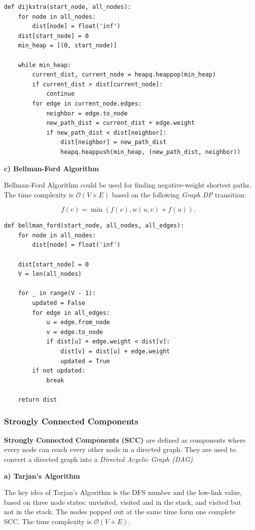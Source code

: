 \documentclass{article}
\begin{document}
\begin{lstlisting}[style=python]
def dijkstra(start_node, all_nodes):
    for node in all_nodes:
        dist[node] = float('inf')
    dist[start_node] = 0
    min_heap = [(0, start_node)]
    
    while min_heap:
        current_dist, current_node = heapq.heappop(min_heap)
        if current_dist > dist[current_node]:
            continue
        for edge in current_node.edges:
            neighbor = edge.to_node
            new_path_dist = current_dist + edge.weight
            if new_path_dist < dist[neighbor]:
                dist[neighbor] = new_path_dist
                heapq.heappush(min_heap, (new_path_dist, neighbor))
\end{lstlisting}

\textbf{c) Bellman-Ford Algorithm}

Bellman-Ford Algorithm could be used for finding negative-weight shortest paths. The time complexity is $\mathcal O(V\times E)$ based on the following \emph{Graph DP} transition:

$$
f(v)=\min(f(v),w(u,v)+f(u)).
$$

\begin{lstlisting}[style=python]
def bellman_ford(start_node, all_nodes, all_edges):
    for node in all_nodes:
        dist[node] = float('inf')
        
    dist[start_node] = 0
    V = len(all_nodes)
    
    for _ in range(V - 1):
        updated = False
        for edge in all_edges:
            u = edge.from_node
            v = edge.to_node
            if dist[u] + edge.weight < dist[v]:
                dist[v] = dist[u] + edge.weight
                updated = True
        if not updated:
            break
            
    return dist
\end{lstlisting}

\subsubsection{Strongly Connected Components}

\textbf{Strongly Connected Components (SCC)} are defined as components where every node can reach every other node in a directed graph. They are used to convert a directed graph into a \emph{Directed Acyclic Graph (DAG)}.

\textbf{a) Tarjan's Algorithm}

The key idea of Tarjan's Algorithm is the DFS number and the low-link value, based on three node states: unvisited, visited and in the stack, and visited but not in the stack. The nodes popped out at the same time form one complete SCC. The time complexity is $\mathcal O(V+E)$.
\end{document}
